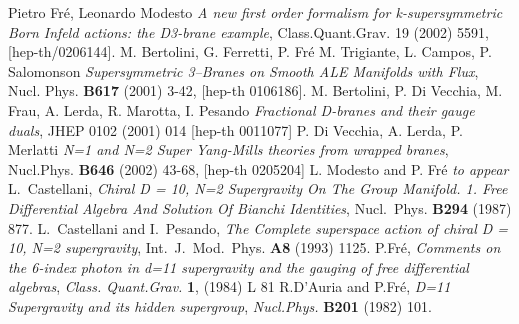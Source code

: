 \documentclass[a4paper,11pt]{article}
\begin{document}
\begin{thebibliography}{99}
%
  Pietro Fr\'e, Leonardo Modesto {\it A new first order formalism for k-supersymmetric Born Infeld actions:
the D3-brane example}, Class.Quant.Grav. 19 (2002) 5591, [hep-th/0206144].
%
%
 M. Bertolini, G. Ferretti, P. Fr\'e M. Trigiante, L. Campos, P. Salomonson
{\it Supersymmetric 3--Branes on Smooth ALE Manifolds
with Flux}, Nucl. Phys. {\bf B617} (2001) 3-42, [hep-th 0106186].
%
 M. Bertolini, P. Di Vecchia, M. Frau, A. Lerda, R. Marotta, I. Pesando {\it Fractional D-branes and their gauge duals}, JHEP 0102 (2001) 014 [hep-th 0011077] 
%
 P. Di Vecchia, A. Lerda, P. Merlatti {\it 
N=1 and N=2 Super Yang-Mills theories from wrapped branes},   
Nucl.Phys. {\bf B646} (2002) 43-68,
[hep-th 0205204] 
%
 L. Modesto and P. Fr\'e {\it to appear}
%
 L.~Castellani,
\emph{Chiral D = 10, N=2 Supergravity On The Group Manifold.
 1. Free Differential Algebra And Solution Of Bianchi Identities},
Nucl.\ Phys. {\bf B294} (1987) 877.
%
 L.~Castellani and I.~Pesando,
\emph{The Complete superspace action of chiral D = 10, N=2
supergravity}, Int.\ J.\ Mod.\ Phys. {\bf A8} (1993) 1125.
%
%
 P.Fr\'e, \emph{Comments on the 6-index photon
in d=11 supergravity and the gauging of free differential algebras}, {\it Class. Quant.Grav.} {\bf 1},
(1984) {L 81}
%
 R.D'Auria and P.Fr\'e, \emph{D=11 Supergravity
and its hidden supergroup}, {\it Nucl.Phys.} {\bf B201} (1982) 101.
%
%
%
%
%

\end{thebibliography}
\end{document}

